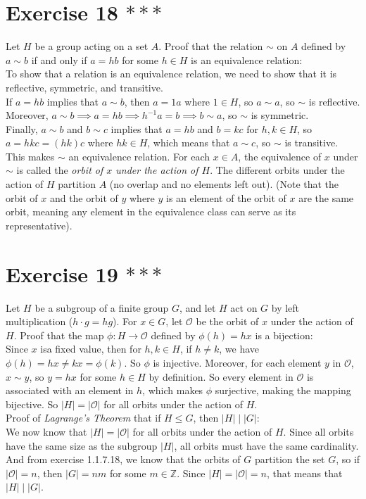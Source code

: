 \documentclass{article}
\newcommand{\Z}{\mathbb{Z}}
\newcommand{\orbit}{\mathcal{O}}
\begin{document}
    \section*{Exercise 18 $***$}
    Let $H$ be a group acting on a set $A$.
    Proof that the relation $\sim$ on $A$ defined by $a \sim b$ if and only
    if $a = hb$ for some $h \in H$ is an equivalence relation: \\
    To show that a relation is an equivalence relation,
    we need to show that it is reflective, symmetric, and transitive. \\
    If $a = hb$ implies that $a \sim b$,
    then $a = 1a$ where $1 \in H$,
    so $a \sim a$,
    so $\sim$ is reflective. \\
    Moreover,
    $a \sim b \implies a = hb \implies h^{-1}a = b \implies b \sim a$,
    so $\sim$ is symmetric. \\
    Finally, $a \sim b$ and $b \sim c$
    implies that $a = hb$ and $b = kc$ for $h, k \in H$,
    so $a = hkc = (hk)c$ where $hk \in H$,
    which means that $a \sim c$,
    so $\sim$ is transitive. \\
    This makes $\sim$ an equivalence relation.
    For each $x \in A$, the equivalence of $x$ under $\sim$ is called
    the \textit{orbit of $x$ under the action of $H$}.
    The different orbits under the action of $H$ partition $A$
    (no overlap and no elements left out).
    (Note that the orbit of $x$ and the orbit of $y$ where $y$ is
    an element of the orbit of $x$ are the same orbit, meaning any element
    in the equivalence class can serve as its representative).


    \section*{Exercise 19 $***$}
    Let $H$ be a subgroup of a finite group $G$,
    and let $H$ act on $G$ by left multiplication ($h \cdot g = hg$).
    For $x \in G$, let $\orbit$ be the orbit of $x$ under the action of $H$.
    Proof that the map $\phi: H \to \orbit$ defined by $\phi(h) = hx$
    is a bijection: \\
    Since $x$ isa fixed value,
    then for $h, k \in H$,
    if $h \neq k$,
    we have $\phi(h) = hx \neq kx = \phi(k)$.
    So $\phi$ is injective.
    Moreover, for each element $y$ in $\orbit$, $x \sim y$,
    so $y = hx$ for some $h \in H$ by definition.
    So every element in $\orbit$ is associated with an element in $h$,
    which makes $\phi$ surjective,
    making the mapping bijective.
    So $|H| = |\orbit|$ for all orbits under the action of $H$. \\
    Proof of \textit{Lagrange's Theorem} that if $H \leqslant G$,
    then $|H| \mid |G|$: \\
    We now know that $|H| = |\orbit|$ for all orbits under the action of $H$.
    Since all orbits have the same size as the subgroup $|H|$,
    all orbits must have the same cardinality.
    And from exercise 1.1.7.18,
    we know that the orbits of $G$ partition the set $G$,
    so if $|\orbit| = n$, then $|G| = nm$ for some $m \in \Z$.
    Since $|H| = |\orbit| = n$, that means that $|H| \mid |G|$.
\end{document}
